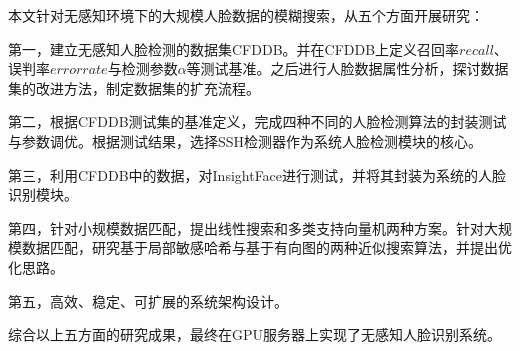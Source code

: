 
\begin{summary}

本文针对无感知环境下的大规模人脸数据的模糊搜索，从五个方面开展研究：

第一，建立无感知人脸检测的数据集CFDDB。并在CFDDB上定义召回率$recall$、误判率$errorrate$与检测参数$\alpha$等测试基准。之后进行人脸数据属性分析，探讨数据集的改进方法，制定数据集的扩充流程。

第二，根据CFDDB测试集的基准定义，完成四种不同的人脸检测算法的封装测试与参数调优。根据测试结果，选择SSH检测器\cite{najibi2017ssh}作为系统人脸检测模块的核心。

第三，利用CFDDB中的数据，对InsightFace\cite{deng2018arcface}进行测试，并将其封装为系统的人脸识别模块。

第四，针对小规模数据匹配，提出线性搜索和多类支持向量机两种方案。针对大规模数据匹配，研究基于局部敏感哈希与基于有向图的两种近似搜索算法，并提出优化思路。

第五，高效、稳定、可扩展的系统架构设计。

综合以上五方面的研究成果，最终在GPU服务器上实现了无感知人脸识别系统。

\end{summary}
